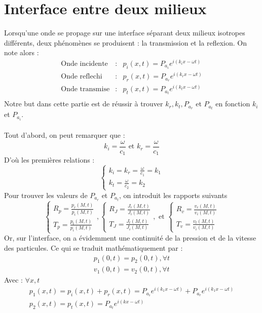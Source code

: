 \section{Interface entre deux milieux}
Lorsqu'une onde se propage sur une interface séparant deux milieux isotropes différents, deux phénomènes se produisent : la transmission et la reflexion. On note alors :
\[
\begin{array}{lcl}
\textrm{Onde incidente} & : & p_i(x,t)=P_{a_i}e^{i(k_ix-\omega t)} \\
\textrm{Onde reflechi} & : & p_r(x,t)=P_{a_r}e^{i(k_rx-\omega t)} \\
\textrm{Onde transmise} & : & p_t(x,t)=P_{a_t}e^{i(k_tx-\omega t)} \\
\end{array}
\]
Notre but dans cette partie est de réussir à trouver $k_r, k_t, P_{a_r}$ et $P_{a_t}$ en fonction $k_i$ et $P_{a_i}$.\\\\
Tout d'abord, on peut remarquer que :
\[ k_i=\frac{\omega}{c_1} \textrm{ et } k_r=\frac{\omega}{c_1} \]
D'où les premières relations :
\[
\left \{
\begin{array}{l}
k_i=k_r=\frac{\omega}{c_1}=k_1 \\
k_t=\frac{\omega}{c_2}=k_2
\end{array}
\right.
\]
Pour trouver les valeurs de $P_{a_r}$ et $P_{a_t}$, on introduit les rapports suivants
\[
\left \{
\begin{array}{l}
R_p=\frac{p_r(M,t)}{p_i(M,t)} \\
T_p=\frac{p_t(M,t)}{p_i(M,t)}
\end{array}
\right.,
\left \{
\begin{array}{l}
R_J=\frac{J_r(M,t)}{J_i(M,t)} \\
T_J=\frac{J_t(M,t)}{J_i(M,t)}
\end{array},
\right.
\textrm{ et }
\left \{
\begin{array}{l}
R_v=\frac{v_r(M,t)}{v_i(M,t)} \\
T_v=\frac{v_t(M,t)}{v_i(M,t)}
\end{array}
\right.
\]
Or, sur l'interface, on a évidemment une continuité de la pression et de la vitesse des particules. Ce qui se traduit mathématiquement par :
\[
\begin{array}{l}
p_1(0,t)=p_2(0,t), \forall t \\ 
v_1(0,t)=v_2(0,t), \forall t 
\end{array}\]
Avec : $\forall x,t$
\[
\begin{array}{l}
p_1(x,t)=p_i(x,t)+p_r(x,t)=P_{a_i}e^{i(k_1x-\omega t)}+P_{a_r}e^{i(k_1x-\omega t)}\\
p_2(x,t)=p_t(x,t)=P_{a_t}e^{i(kx-\omega t)}
\end{array}
\]

